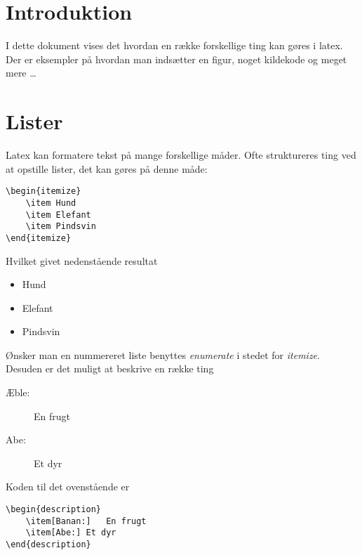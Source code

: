 \documentclass[11pt,a4paper,fleqn]{article}
\begin{document}
\templateforside
\templatetableofcontents
\listoftodos
\newpage


\section{Introduktion}

I dette dokument vises det hvordan en række forskellige ting kan
gøres i latex. 
%
Der er eksempler på hvordan man indsætter en figur, noget kildekode
og meget mere \ldots

\section{Lister}

Latex kan formatere tekst på mange forskellige måder. 
Ofte struktureres ting ved at opstille lister, det kan gøres på denne måde:
%
\begin{lstlisting}
\begin{itemize}
	\item Hund
	\item Elefant
	\item Pindsvin
\end{itemize}
\end{lstlisting}
%
Hvilket givet nedenstående resultat
%
\begin{itemize}
	\item Hund
	\item Elefant
	\item Pindsvin
\end{itemize}
%
Ønsker man en nummereret liste benyttes \emph{enumerate} i stedet for \emph{itemize}.
%
Desuden er det muligt at beskrive en række ting
%
\begin{description}
	\item[Æble:] 	En frugt
	\item[Abe:]	Et dyr
\end{description}
%
Koden til det ovenstående er
%
\begin{lstlisting}
\begin{description}
	\item[Banan:] 	En frugt
	\item[Abe:]	Et dyr
\end{description}
\end{lstlisting}
\end{document}
